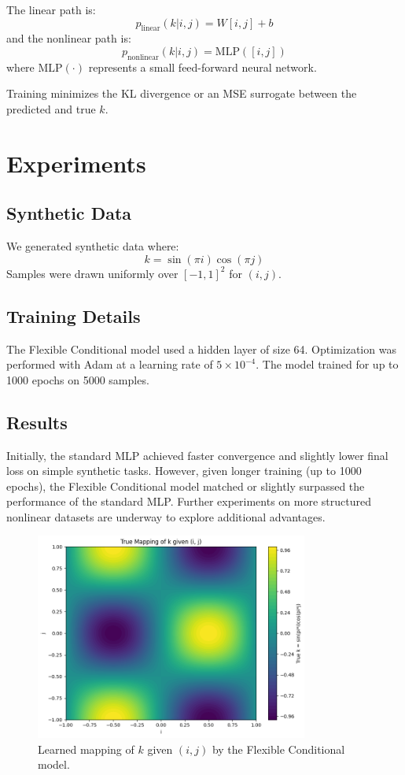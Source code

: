 \documentclass[11pt]{article}
\begin{document}
The linear path is:
\begin{equation}
    p_{\text{linear}}(k|i,j) = W[i, j] + b
\end{equation}
and the nonlinear path is:
\begin{equation}
    p_{\text{nonlinear}}(k|i,j) = \text{MLP}([i,j])
\end{equation}
where $\text{MLP}(\cdot)$ represents a small feed-forward neural network.

Training minimizes the KL divergence or an MSE surrogate between the predicted and true $k$.

\section{Experiments}
\subsection{Synthetic Data}
We generated synthetic data where:
\begin{equation}
    k = \sin(\pi i) \cos(\pi j)
\end{equation}
Samples were drawn uniformly over $[-1,1]^2$ for $(i,j)$.

\subsection{Training Details}
The Flexible Conditional model used a hidden layer of size 64. Optimization was performed with Adam at a learning rate of $5 \times 10^{-4}$. The model trained for up to 1000 epochs on 5000 samples.

\subsection{Results}
Initially, the standard MLP achieved faster convergence and slightly lower final loss on simple synthetic tasks. However, given longer training (up to 1000 epochs), the Flexible Conditional model matched or slightly surpassed the performance of the standard MLP. Further experiments on more structured nonlinear datasets are underway to explore additional advantages.

\begin{figure}[h]
\centering
\includegraphics[width=0.8\textwidth]{figures/example_contour.png}
\caption{Learned mapping of $k$ given $(i, j)$ by the Flexible Conditional model.}
\label{fig:contour}
\end{figure}
\end{document}

